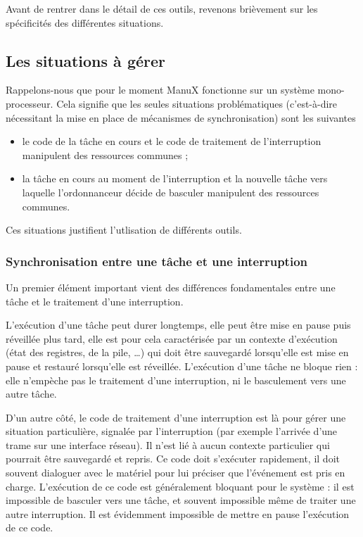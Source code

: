    Avant de rentrer dans le détail de ces outils, revenons brièvement
sur les spécificités des différentes situations.
   
\subsection{Les situations à gérer}

   Rappelons-nous que pour le moment ManuX fonctionne sur un système
mono-processeur. Cela signifie que les seules situations
problématiques (c'est-à-dire nécessitant la mise en place de
mécanismes de synchronisation) sont les suivantes

\begin{itemize}
   \item le code de la tâche en cours et le code de traitement de
     l'interruption manipulent des ressources communes ;
   \item la tâche en cours au moment de l'interruption et la
     nouvelle tâche vers laquelle l'ordonnanceur décide de basculer
     manipulent des ressources communes.
\end{itemize}

   Ces situations justifient l'utlisation de différents outils.

%
\subsubsection{Synchronisation entre une tâche et une interruption}

   Un premier élément important vient des différences fondamentales entre
une tâche et le traitement d'une interruption.

   L'exécution d'une tâche peut durer longtemps, elle peut être mise
en pause puis réveillée plus tard, elle est pour cela caractérisée par
un contexte d'exécution (état des registres, de la pile, \ldots) qui
doit être sauvegardé lorsqu'elle est mise en pause et restauré
lorsqu'elle est réveillée. L'exécution d'une tâche ne bloque rien :
elle n'empèche pas le traitement d'une interruption, ni le basculement
vers une autre tâche.

   D'un autre côté, le code de traitement d'une interruption est là
pour gérer une situation particulière, signalée par l'interruption
(par exemple l'arrivée d'une trame sur une interface réseau). Il n'est
lié à aucun contexte particulier qui pourrait être sauvegardé et
repris. Ce code doit s'exécuter rapidement, il doit souvent dialoguer
avec le matériel pour lui préciser que l'événement est pris en
charge. L'exécution de ce code est généralement bloquant pour le
système : il est impossible de basculer vers une tâche, et souvent
impossible même de traiter une autre interruption. Il est évidemment
impossible de mettre en pause l'exécution de ce code.

